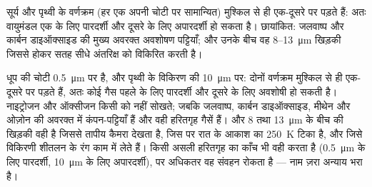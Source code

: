 \begin{omfigure}

{\small सूर्य और पृथ्वी के वर्णक्रम (हर एक अपनी चोटी पर
सामान्यित) मुश्किल से ही एक-दूसरे पर पड़ते हैं: अतः वायुमंडल एक के लिए पारदर्शी और
दूसरे के लिए अपारदर्शी हो सकता है। छायांकित: जलवाष्प और कार्बन डाइऑक्साइड की
मुख्य अवरक्त अवशोषण पट्टियाँ; और उनके बीच वह \qty{8}{}--\qty{13}{\micro m}
खिड़की जिससे होकर सतह सीधे अंतरिक्ष को विकिरित करती है।}
\end{omfigure}

\begin{remark}[हरितगृह वरणात्मक क्यों है]\label{rem:b2:thermal-radiation:selective}
धूप की चोटी \qty{0.5}{\micro m} पर है, और पृथ्वी के विकिरण की
\qty{10}{\micro m} पर: दोनों वर्णक्रम मुश्किल से ही एक-दूसरे पर पड़ते हैं, अतः कोई गैस
पहले के लिए पारदर्शी और दूसरे के लिए अवशोषी हो सकती है। नाइट्रोजन और
ऑक्सीजन किसी को नहीं सोखते; जबकि जलवाष्प, कार्बन डाइऑक्साइड, मीथेन और ओज़ोन
की अवरक्त में कंपन-पट्टियाँ हैं और वही हरितगृह गैसें हैं। और
\qty{8}{} तथा \qty{13}{\micro m} के बीच की खिड़की वही है जिससे तापीय कैमरा
देखता है, जिस पर रात के आकाश का \qty{250}{K} टिका है, और जिसे
विकिरणी शीतलन के रंग काम में लेते हैं। किसी असली हरितगृह का काँच भी वही
करता है (\qty{0.5}{\micro m} के लिए पारदर्शी, \qty{10}{\micro m} के लिए अपारदर्शी),
पर अधिकतर वह संवहन रोकता है --- नाम ज़रा अन्याय भरा है।
\end{remark}

